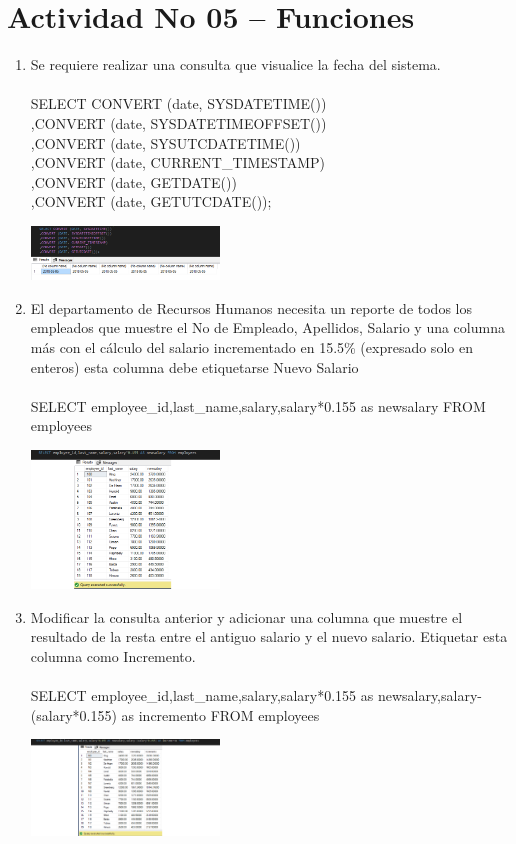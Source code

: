 \section{Actividad No 05 – Funciones}
	
\begin{enumerate}[1.]
	\item Se requiere realizar una consulta que visualice la fecha del sistema.
	\\
	\\SELECT CONVERT (date, SYSDATETIME())
	\\,CONVERT (date, SYSDATETIMEOFFSET())
	\\,CONVERT (date, SYSUTCDATETIME())
	\\,CONVERT (date, CURRENT\_TIMESTAMP)
	\\,CONVERT (date, GETDATE())
    	\\,CONVERT (date, GETUTCDATE());
	\begin{center}
	\includegraphics[width=5cm]{./Imagenes/actividad_05_01}
	\end{center}
	
	\item El departamento de Recursos Humanos necesita un reporte de todos los empleados que muestre el No de Empleado, Apellidos, Salario y una columna más con el cálculo del salario incrementado en 15.5\% (expresado solo en enteros) esta columna debe etiquetarse Nuevo Salario
	\\
	\\SELECT employee\_id,last\_name,salary,salary*0.155 as newsalary FROM employees
	\begin{center}
	\includegraphics[width=5cm]{./Imagenes/actividad_05_02}
	\end{center}

	\item Modificar la consulta anterior y adicionar una columna que muestre el resultado de la resta entre el antiguo salario y el nuevo salario. Etiquetar esta columna como Incremento.
	\\
	\\SELECT employee\_id,last\_name,salary,salary*0.155 as newsalary,salary-(salary*0.155) as incremento FROM employees
	\begin{center}
	\includegraphics[width=5cm]{./Imagenes/actividad_05_03}
	\end{center}


\end{enumerate}
